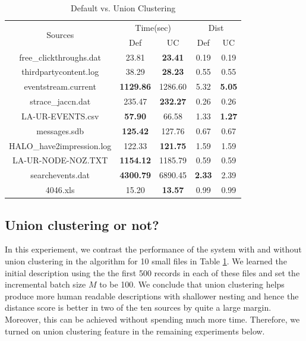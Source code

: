 {\begin{table}[th]
\centering
\caption{Default vs. Union Clustering}
\label{tab:uceffects}
\begin{tabular}{|c||c|c||c|c|} \hline
\multirow{2}{*}{Sources} & \multicolumn{2}{c||}{Time(sec)} & \multicolumn{2}{c|}{Dist} \\ \cline{2-5}
 & Def & UC &  Def & UC \\ \hline 
free\_clickthroughs.dat & 23.81  & {\bf 23.41} & 0.19 & 0.19 \\ \hline
thirdpartycontent.log & 38.29 & {\bf 28.23} & 0.55 & 0.55 \\ \hline
eventstream.current & {\bf 1129.86} & 1286.60 & 5.32 & {\bf 5.05} \\ \hline
strace\_jaccn.dat & 235.47 & {\bf 232.27} & 0.26 & 0.26 \\ \hline
LA-UR-EVENTS.csv & {\bf 57.90} & 66.58 & 1.33 & {\bf 1.27} \\ \hline
messages.sdb & {\bf 125.42} & 127.76 & 0.67 & 0.67 \\ \hline
HALO\_have2impression.log & 122.33 & {\bf 121.75} & 1.59 & 1.59 \\ \hline
LA-UR-NODE-NOZ.TXT & {\bf 1154.12} & 1185.79 & 0.59 & 0.59 \\ \hline
searchevents.dat & {\bf 4300.79} & 6890.45 & {\bf 2.33} & 2.39 \\ \hline
4046.xls & 15.20 & {\bf 13.57} & 0.99 & 0.99  \\ \hline
\end{tabular}
\end{table}

\subsection{Union clustering or not?}
In this experiement, we contrast the performance of the system with and without
union clustering in the \learnpads{} algorithm for 10 small files in 
Table \ref{tab:uceffects}. We learned the initial description using the
the first 500 records in each of these files and set the
incremental batch size $M$ to be 100. We conclude that
union clustering helps produce more human readable descriptions with shallower
nesting and hence the distance score is better in two of the ten sources by
quite a large margin. Moreover, this can be achieved without spending much 
more time. Therefore, we turned on union clustering feature in the remaining
experiments below. 
}

